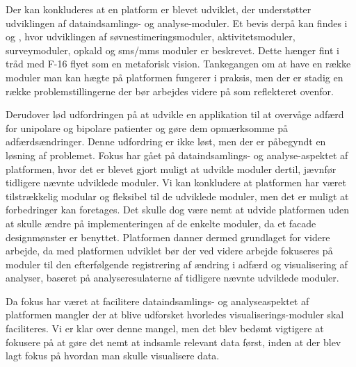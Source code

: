 Der kan konkluderes at en platform er blevet udviklet, der understøtter udviklingen af dataindsamlings- og analyse-moduler.
Et bevis derpå kan findes i \citet{misc:soevnrapp} og \citet{misc:surveyrapp}, hvor udviklingen af søvnestimeringsmoduler, aktivitetsmoduler, surveymoduler, opkald og sms/mms moduler er beskrevet.
Dette hænger fint i tråd med F-16 flyet som en metaforisk vision.
Tankegangen om at have en række moduler man kan hægte på platformen fungerer i praksis, men der er stadig en række problemstillingerne der bør arbejdes videre på som reflekteret ovenfor.

Derudover lød udfordringen på at udvikle en applikation til at overvåge adfærd for unipolare og bipolare patienter og gøre dem opmærksomme på adfærdsændringer.
Denne udfordring er ikke løst, men der er påbegyndt en løsning af problemet.
Fokus har gået på dataindsamlings- og analyse-aspektet af platformen, hvor det er blevet gjort muligt at udvikle moduler dertil, jævnfør tidligere nævnte udviklede moduler.
Vi kan konkludere at platformen har været tilstrækkelig modular og fleksibel til de udviklede moduler, men det er muligt at forbedringer kan foretages.
Det skulle dog være nemt at udvide platformen uden at skulle ændre på implementeringen af de enkelte moduler, da et facade designmønster er benyttet.
Platformen danner dermed grundlaget for videre arbejde, da med platformen udviklet bør der ved videre arbejde fokuseres på moduler til den efterfølgende registrering af ændring i adfærd og visualisering af analyser, baseret på analyseresulaterne af tidligere nævnte udviklede moduler.

Da fokus har været at facilitere dataindsamlings- og analyseaspektet af platformen mangler der at blive udforsket hvorledes visualiserings-moduler skal faciliteres.
Vi er klar over denne mangel, men det blev bedømt vigtigere at fokusere på at gøre det nemt at indsamle relevant data først, inden at der blev lagt fokus på hvordan man skulle visualisere data.

